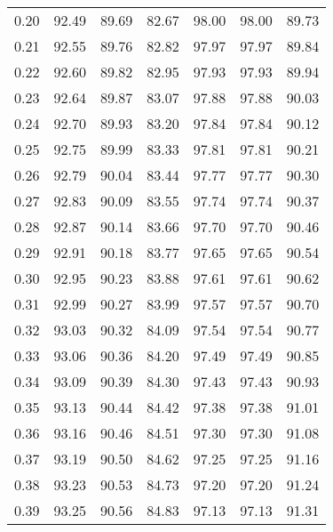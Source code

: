 \begin{tabular}{|c|c|c|c|c|c|c|}
      0.20 &     92.49 &     89.69 &      82.67 &   98.00 &      98.00 &         89.73 \\
      0.21 &     92.55 &     89.76 &      82.82 &   97.97 &      97.97 &         89.84 \\
      0.22 &     92.60 &     89.82 &      82.95 &   97.93 &      97.93 &         89.94 \\
      0.23 &     92.64 &     89.87 &      83.07 &   97.88 &      97.88 &         90.03 \\
      0.24 &     92.70 &     89.93 &      83.20 &   97.84 &      97.84 &         90.12 \\
      0.25 &     92.75 &     89.99 &      83.33 &   97.81 &      97.81 &         90.21 \\
      0.26 &     92.79 &     90.04 &      83.44 &   97.77 &      97.77 &         90.30 \\
      0.27 &     92.83 &     90.09 &      83.55 &   97.74 &      97.74 &         90.37 \\
      0.28 &     92.87 &     90.14 &      83.66 &   97.70 &      97.70 &         90.46 \\
      0.29 &     92.91 &     90.18 &      83.77 &   97.65 &      97.65 &         90.54 \\
      0.30 &     92.95 &     90.23 &      83.88 &   97.61 &      97.61 &         90.62 \\
      0.31 &     92.99 &     90.27 &      83.99 &   97.57 &      97.57 &         90.70 \\
      0.32 &     93.03 &     90.32 &      84.09 &   97.54 &      97.54 &         90.77 \\
      0.33 &     93.06 &     90.36 &      84.20 &   97.49 &      97.49 &         90.85 \\
      0.34 &     93.09 &     90.39 &      84.30 &   97.43 &      97.43 &         90.93 \\
      0.35 &     93.13 &     90.44 &      84.42 &   97.38 &      97.38 &         91.01 \\
      0.36 &     93.16 &     90.46 &      84.51 &   97.30 &      97.30 &         91.08 \\
      0.37 &     93.19 &     90.50 &      84.62 &   97.25 &      97.25 &         91.16 \\
      0.38 &     93.23 &     90.53 &      84.73 &   97.20 &      97.20 &         91.24 \\
      0.39 &     93.25 &     90.56 &      84.83 &   97.13 &      97.13 &         91.31 \\

\end{tabular}
